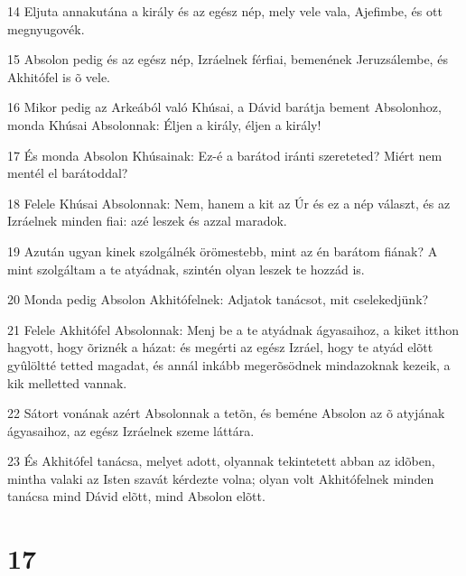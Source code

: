 \par 14 Eljuta annakutána a király és az egész nép, mely vele vala, Ajefimbe, és ott megnyugovék.
\par 15 Absolon pedig és az egész nép, Izráelnek férfiai, bemenének Jeruzsálembe, és Akhitófel is õ vele.
\par 16 Mikor pedig az Arkeából való Khúsai, a Dávid barátja bement Absolonhoz, monda Khúsai Absolonnak: Éljen a  király, éljen a király!
\par 17 És monda Absolon Khúsainak: Ez-é a barátod iránti szereteted? Miért nem mentél el barátoddal?
\par 18 Felele Khúsai Absolonnak: Nem, hanem a kit az Úr és ez a nép választ, és az Izráelnek minden fiai: azé leszek és azzal maradok.
\par 19 Azután ugyan kinek szolgálnék örömestebb, mint az én barátom fiának? A mint szolgáltam a te atyádnak, szintén olyan leszek te hozzád is.
\par 20 Monda pedig Absolon Akhitófelnek: Adjatok tanácsot, mit cselekedjünk?
\par 21 Felele Akhitófel Absolonnak: Menj be a te atyádnak ágyasaihoz, a kiket itthon hagyott, hogy õriznék a házat: és megérti az egész Izráel, hogy te atyád elõtt gyûlöltté tetted magadat, és annál inkább megerõsödnek mindazoknak kezeik, a kik melletted vannak.
\par 22 Sátort vonának azért Absolonnak a tetõn, és beméne Absolon az õ atyjának ágyasaihoz, az egész Izráelnek szeme láttára.
\par 23 És Akhitófel tanácsa, melyet adott, olyannak tekintetett abban az idõben, mintha valaki az Isten szavát kérdezte volna; olyan volt Akhitófelnek minden tanácsa mind Dávid elõtt, mind Absolon elõtt.

\chapter{17}

